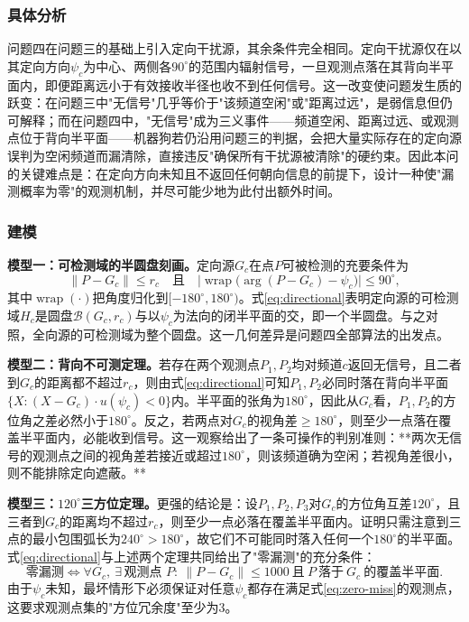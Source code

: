 \documentclass[12pt,a4paper]{ctexart}
\begin{document}
\subsubsection{具体分析}

问题四在问题三的基础上引入定向干扰源，其余条件完全相同。定向干扰源仅在以其定向方向$\psi_c$为中心、两侧各$90^\circ$的范围内辐射信号，一旦观测点落在其背向半平面内，即便距离远小于有效接收半径也收不到任何信号。这一改变使问题发生质的跃变：在问题三中"无信号"几乎等价于"该频道空闲"或"距离过远"，是弱信息但仍可解释；而在问题四中，"无信号"成为三义事件——频道空闲、距离过远、或观测点位于背向半平面——机器狗若仍沿用问题三的判据，会把大量实际存在的定向源误判为空闲频道而漏清除，直接违反"确保所有干扰源被清除"的硬约束。因此本问的关键难点是：在定向方向未知且不返回任何朝向信息的前提下，设计一种使"漏测概率为零"的观测机制，并尽可能少地为此付出额外时间。

\subsubsection{建模}

\textbf{模型一：可检测域的半圆盘刻画。}定向源$G_c$在点$P$可被检测的充要条件为
\begin{equation}
\lVert P-G_c\rVert\le r_c\quad\text{且}\quad \bigl|\operatorname{wrap}\bigl(\arg(P-G_c)-\psi_c\bigr)\bigr|\le 90^\circ,
\label{eq:directional}
\end{equation}
其中$\operatorname{wrap}(\cdot)$把角度归化到$[-180^\circ,180^\circ)$。式\eqref{eq:directional}表明定向源的可检测域$H_c$是圆盘$\mathcal{B}(G_c,r_c)$与以$\psi_c$为法向的闭半平面的交，即一个半圆盘。与之对照，全向源的可检测域为整个圆盘。这一几何差异是问题四全部算法的出发点。

\textbf{模型二：背向不可测定理。}若存在两个观测点$P_1,P_2$均对频道$c$返回无信号，且二者到$G_c$的距离都不超过$r_c$，则由式\eqref{eq:directional}可知$P_1,P_2$必同时落在背向半平面$\{X:(X-G_c)\cdot u(\psi_c)<0\}$内。半平面的张角为$180^\circ$，因此从$G_c$看，$P_1,P_2$的方位角之差必然小于$180^\circ$。反之，若两点对$G_c$的视角差$\ge180^\circ$，则至少一点落在覆盖半平面内，必能收到信号。这一观察给出了一条可操作的判别准则：**两次无信号的观测点之间的视角差若接近或超过$180^\circ$，则该频道确为空闲；若视角差很小，则不能排除定向遮蔽。**

\textbf{模型三：$120^\circ$三方位定理。}更强的结论是：设$P_1,P_2,P_3$对$G_c$的方位角互差$120^\circ$，且三者到$G_c$的距离均不超过$r_c$，则至少一点必落在覆盖半平面内。证明只需注意到三点的最小包围弧长为$240^\circ>180^\circ$，故它们不可能同时落入任何一个$180^\circ$的半平面。式\eqref{eq:directional}与上述两个定理共同给出了"零漏测"的充分条件：
\begin{equation}
\text{零漏测}\iff \forall G_c,\ \exists\,\text{观测点 }P:\ \lVert P-G_c\rVert\le1000\ \text{且}\ P\ \text{落于}\ G_c\ \text{的覆盖半平面}.
\label{eq:zero-miss}
\end{equation}
由于$\psi_c$未知，最坏情形下必须保证对任意$\psi_c$都存在满足式\eqref{eq:zero-miss}的观测点，这要求观测点集的"方位冗余度"至少为$3$。
\end{document}
